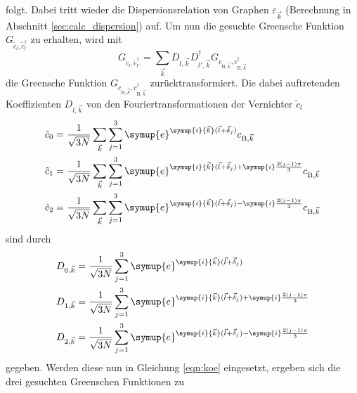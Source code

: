 folgt. 
Dabei tritt wieder die Dispersionsrelation von Graphen $\varepsilon_{\vec{k}}$ (Berechnung in Abschnitt \ref{sec:calc_dispersion}) auf. 
Um nun die gesuchte Greensche Funktion $G_{\tilde{c}_l, \tilde{c}_l^{\dagger}}$ zu erhalten, wird mit 
\begin{equation}
    G_{\tilde{c}_l, \tilde{c}^\dagger_{l'}} = \sum_{\vec{k}} D_{l,\vec{k}} D^\dagger_{l',\vec{k}}G_{c_{\text{B},\vec{k}}, c^\dagger_{\text{B},\vec{k}}} \label{eqn:koe}
\end{equation}
die Greensche Funktion $G_{c_{\text{B},\vec{k}}, c^\dagger_{\text{B},\vec{k}}}$ zurücktransformiert.
Die dabei auftretenden Koeffizienten $D_{l,\vec{k}}$ von den Fouriertransformationen der Vernichter $\tilde{c}_l$
\begin{align*}
    \tilde{c}_0 &= \frac{1}{\sqrt{3N}}\sum_{\vec{k}} \sum_{j=1}^3\symup{e}^{\symup{i}{\vec{k}}(\vec{l}+\vec{\delta}_j)}                              c_{\text{B}, \vec{k}}  \\
    \tilde{c}_1 &= \frac{1}{\sqrt{3N}}\sum_{\vec{k}} \sum_{j=1}^3\symup{e}^{\symup{i}{\vec{k}}(\vec{l}+\vec{\delta}_j)+\symup{i}\frac{2(j-1)\pi}{3}} c_{\text{B}, \vec{k}}  \\
    \tilde{c}_2 &= \frac{1}{\sqrt{3N}}\sum_{\vec{k}} \sum_{j=1}^3\symup{e}^{\symup{i}{\vec{k}}(\vec{l}+\vec{\delta}_j)-\symup{i}\frac{2(j-1)\pi}{3}} c_{\text{B}, \vec{k}}  
\end{align*}
sind durch
\begin{equation}
    \begin{aligned}
    D_{0,\vec{k}} &= \frac{1}{\sqrt{3N}}\sum_{j=1}^3\symup{e}^{\symup{i}{\vec{k}}(\vec{l}+\vec{\delta}_j)} \\
    D_{1,\vec{k}} &= \frac{1}{\sqrt{3N}}\sum_{j=1}^3\symup{e}^{\symup{i}{\vec{k}}(\vec{l}+\vec{\delta}_j)+\symup{i}\frac{2(j-1)\pi}{3}}  \\
    D_{2,\vec{k}} &= \frac{1}{\sqrt{3N}}\sum_{j=1}^3\symup{e}^{\symup{i}{\vec{k}}(\vec{l}+\vec{\delta}_j)-\symup{i}\frac{2(j-1)\pi}{3}}  \label{eqn:fourierko}
    \end{aligned}    
\end{equation}
gegeben.
Werden diese nun in Gleichung \eqref{eqn:koe} eingesetzt, ergeben sich die drei gesuchten Greenschen Funktionen zu 
